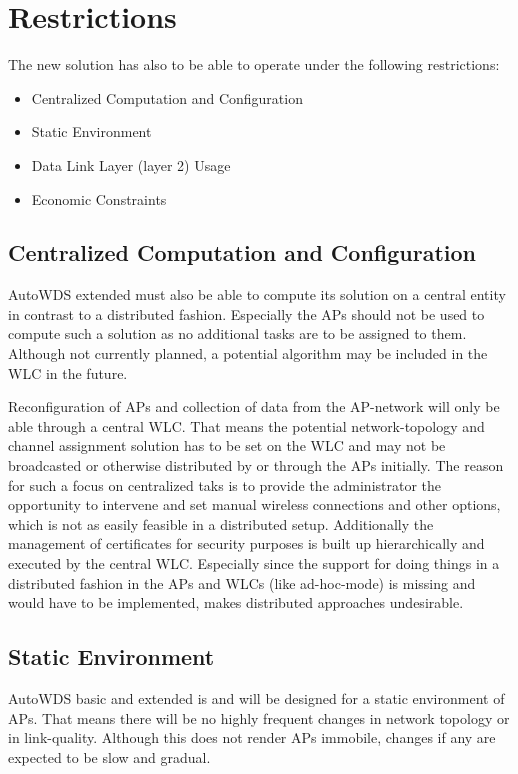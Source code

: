   \section{Restrictions}
    The new solution has also to be able to operate under the following restrictions:
    \begin{itemize}
     \item Centralized Computation and Configuration
     \item Static Environment
     \item Data Link Layer (layer 2) Usage
     \item Economic Constraints
    \end{itemize}
    
    \subsection{Centralized Computation and Configuration}
      AutoWDS extended must also be able to compute its solution on a central entity in contrast to a distributed fashion.
      Especially the APs should not be used to compute such a solution as no additional tasks are to be assigned to them.
      Although not currently planned, a potential algorithm may be included in the \ac{WLC} in the future.
      
      Reconfiguration of APs and collection of data from the \ac{AP}-network will only be able through a central \ac{WLC}.
      That means the potential network-topology and channel assignment solution has to be set on the \ac{WLC} and may not be broadcasted or otherwise
      distributed by or through the APs initially. The reason for such a focus on centralized taks is to provide the administrator the 
      opportunity to intervene and set manual wireless connections and other options, which is not as easily feasible in a distributed setup. 
      Additionally the management of certificates for security purposes is built up hierarchically and executed by the central \ac{WLC}.
      Especially since the support for doing things in a distributed fashion in the APs and WLCs (like ad-hoc-mode) is missing and would have to be implemented, 
      makes distributed approaches undesirable.
      
    \subsection{Static Environment}
      AutoWDS basic and extended is and will be designed for a static environment of APs. That means there will be no highly frequent changes in
      network topology or in link-quality. Although this does not render APs immobile, changes if any are expected to be slow and gradual.
      
